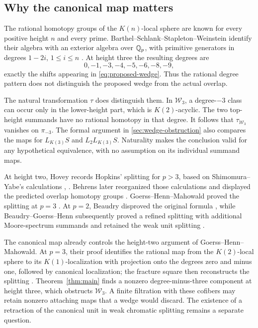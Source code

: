 \subsection{Why the canonical map matters}

The rational homotopy groups of the \(K(n)\)-local sphere are known
for every positive height \(n\) and every prime. Barthel--Schlank--Stapleton--Weinstein
identify their algebra with an exterior algebra over \(\mathbb Q_p\), with
primitive generators in degrees \(1-2i\), \(1\leq i\leq n\)
\cite[Theorem~A]{BSSW2025}. At height three the resulting degrees are
\[
 0,-1,-3,-4,-5,-6,-8,-9,
\]
exactly the shifts appearing in \eqref{eq:proposed-wedge}. Thus the
rational degree pattern does not distinguish the proposed wedge from
the actual overlap.

The natural transformation \(\tau\) does distinguish them. In
\(\mathcal W_3\), a degree-\(-3\) class can occur only in the
lower-height part, which is \(K(2)\)-acyclic. The two top-height
summands have no rational homotopy in that degree. It follows that
\(\tau_{\mathcal W_3}\) vanishes on \(\pi_{-3}\). The formal argument
in \cref{sec:wedge-obstruction} also compares the maps for
\(L_{K(3)}S\) and \(L_2L_{K(3)}S\). Naturality makes the conclusion
valid for any hypothetical equivalence, with no assumption on its
individual summand maps.

At height two, Hovey records Hopkins' splitting
for \(p>3\), based on Shimomura--Yabe's calculations
\cite[\S4]{Hovey1995}, \cite[Theorem~2.4]{ShimomuraYabe1995}. Behrens later reorganized those calculations
and displayed the predicted overlap homotopy groups
\cite[Remark~7.8]{Behrens2012}. Goerss--Henn--Mahowald proved the
splitting at \(p=3\) \cite[Theorem~5.11]{GHM2014}. At \(p=2\),
Beaudry disproved the original formula \cite[Theorem~1.4]{Beaudry2017},
while Beaudry--Goerss--Henn subsequently proved a refined splitting
with additional Moore-spectrum summands and retained the weak unit
splitting \cite[Theorem~1.1.6]{BGH2022}.

The canonical map already controls the height-two argument of
Goerss--Henn--Mahowald. At \(p=3\), their proof identifies the rational
map from the \(K(2)\)-local sphere to its \(K(1)\)-localization with
projection onto the degrees zero and minus one, followed by canonical
localization; the fracture square then reconstructs the splitting
\cite[proof of Theorem~5.11, p.~1288]{GHM2014}.
Theorem~\ref{thm:main} finds a nonzero degree-minus-three component at
height three, which obstructs \(\mathcal W_3\). A finite filtration
with these cofibers may retain nonzero attaching maps that a wedge
would discard. The existence of a retraction of the canonical unit
in weak chromatic splitting remains a separate question.

